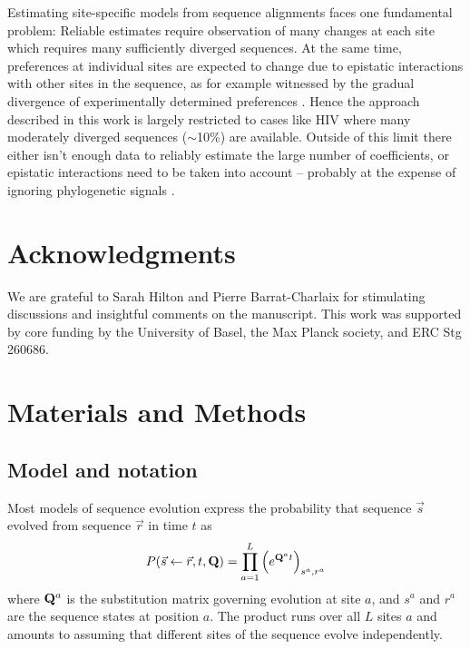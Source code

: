 \documentclass[aps,rmp,twocolumn,linenumbers]{revtex4-1}
\newcommand{\mat}[1]{{\bf #1}}
\begin{document}
Estimating site-specific models from sequence alignments faces one fundamental problem:
Reliable estimates require observation of many changes at each site which requires many sufficiently diverged sequences.
At the same time, preferences at individual sites are expected to change due to epistatic interactions with other sites in the sequence, as for example witnessed by the gradual divergence of experimentally determined preferences \citep{doud_site-specific_2015,haddox_mapping_2018}.
Hence the approach described in this work is largely restricted to cases like HIV where many moderately diverged sequences ($\sim$10\%) are available.
Outside of this limit there either isn't enough data to reliably estimate the large number of coefficients, or epistatic interactions need to be taken into account -- probably at the expense of ignoring phylogenetic signals \citep{morcos_direct-coupling_2011}.

\section*{Acknowledgments}
We are grateful to Sarah Hilton and Pierre Barrat-Charlaix for stimulating discussions and insightful comments on the manuscript.
This work was supported by core funding by the University of Basel, the Max Planck society, and ERC Stg 260686.



\onecolumngrid

\section*{Materials and Methods}
\subsection*{Model and notation}
\label{sec:MM_model}
Most models of sequence evolution express the probability that sequence $\vec{s}$ evolved from sequence $\vec{r}$ in time $t$ as
\begin{equation}
P(\vec{s}\leftarrow \vec{r},t,\mat{Q}) = \prod_{a=1}^L \left(e^{\mat{Q}^{a} t}\right)_{s^{a},r^{a}}
\label{eq:P_prob}
\end{equation}
where $\mat{Q}^{a}$ is the substitution matrix governing evolution at site $a$, and $s^{a}$ and $r^{a}$ are the sequence states at position $a$.
The product runs over all $L$ sites $a$ and amounts to assuming that different sites of the sequence evolve independently.
\end{document}
